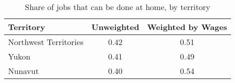 \begin{table}[ht]
\centering
\caption{Share of jobs that can be done at home, by territory} 
\label{tab:territory}
\begin{tabular}{lcc}
  \hline
Territory & Unweighted & Weighted by Wages \\ 
  \hline
Northwest Territories & 0.42 & 0.51 \\ 
  Yukon & 0.41 & 0.49 \\ 
  Nunavut & 0.40 & 0.54 \\ 
   \hline
\end{tabular}
\end{table}
